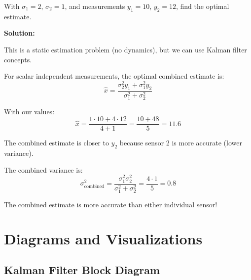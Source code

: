 With $\sigma_1 = 2$, $\sigma_2 = 1$, and measurements $y_1 = 10$, $y_2 = 12$, find the optimal estimate.

\textbf{Solution:}

This is a static estimation problem (no dynamics), but we can use Kalman filter concepts.

For scalar independent measurements, the optimal combined estimate is:
\begin{equation}
\hat{x} = \frac{\sigma_2^2 y_1 + \sigma_1^2 y_2}{\sigma_1^2 + \sigma_2^2}
\end{equation}

With our values:
\begin{equation}
\hat{x} = \frac{1 \cdot 10 + 4 \cdot 12}{4 + 1} = \frac{10 + 48}{5} = 11.6
\end{equation}

The combined estimate is closer to $y_2$ because sensor 2 is more accurate (lower variance).

The combined variance is:
\begin{equation}
\sigma_{\text{combined}}^2 = \frac{\sigma_1^2 \sigma_2^2}{\sigma_1^2 + \sigma_2^2} = \frac{4 \cdot 1}{5} = 0.8
\end{equation}

The combined estimate is more accurate than either individual sensor!

\section{Diagrams and Visualizations}

\subsection{Kalman Filter Block Diagram}

